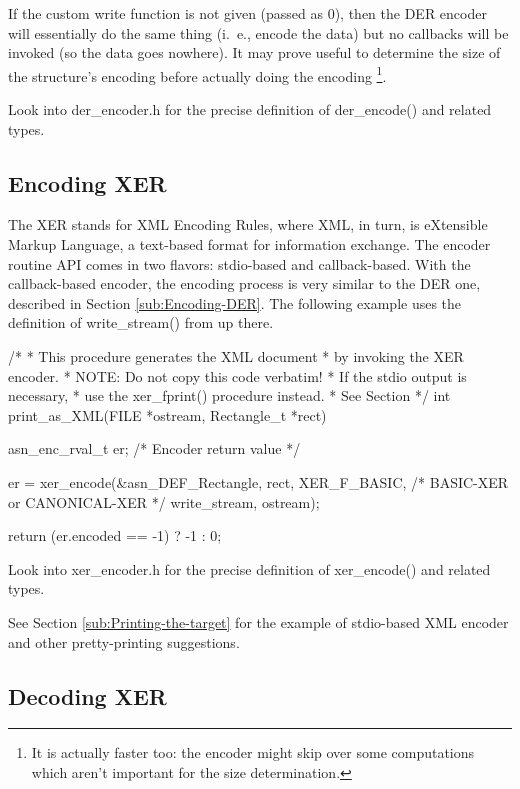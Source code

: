 \documentclass[english,oneside,12pt]{book}
\begin{document}
If the custom write function is not given (passed as 0), then the
DER encoder will essentially do the same thing (i.~e., encode the data)
but no callbacks will be invoked (so the data goes nowhere). It may
prove useful to determine the size of the structure's encoding before
actually doing the encoding%
\footnote{It is actually faster too: the encoder might skip over some computations
which aren't important for the size determination.%
}.

Look into der\_encoder.h for the precise definition of der\_encode()
and related types.


\subsection{\label{sub:Encoding-XER}Encoding XER}

The XER stands for XML Encoding Rules, where XML, in turn, is eXtensible
Markup Language, a text-based format for information exchange. The
encoder routine API comes in two flavors: stdio-based and callback-based.
With the callback-based encoder, the encoding process is very similar
to the DER one, described in Section \vref{sub:Encoding-DER}. The
following example uses the definition of write\_stream() from up there.
\begin{codesample}
/*
 * This procedure generates the XML document
 * by invoking the XER encoder.
 * NOTE: Do not copy this code verbatim!
 *       If the stdio output is necessary,
 *       use the xer_fprint() procedure instead.
 *       See Section%
 */
int
print_as_XML(FILE *ostream, Rectangle_t *rect) {
    asn_enc_rval_t er;  /* Encoder return value */

    er = xer_encode(&asn_DEF_Rectangle, rect,
        XER_F_BASIC, /* BASIC-XER or CANONICAL-XER */
        write_stream, ostream);

    return (er.encoded == -1) ? -1 : 0;
}
\end{codesample}
Look into xer\_encoder.h for the precise definition of xer\_encode()
and related types.

See Section \ref{sub:Printing-the-target} for the example of stdio-based
XML encoder and other pretty-printing suggestions.


\subsection{\label{sub:Decoding-XER}Decoding XER}
\end{document}
